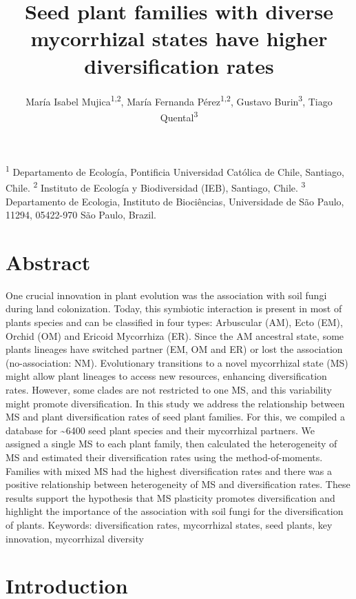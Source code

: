 \documentclass[12pt,]{article}
\title{Seed plant families with diverse mycorrhizal states have higher
diversification rates}
\author{María Isabel Mujica\textsuperscript{1,2}, María Fernanda
Pérez\textsuperscript{1,2}, Gustavo Burin\textsuperscript{3}, Tiago
Quental\textsuperscript{3}}
\date{}
\begin{document}
\maketitle

\textsuperscript{1} Departamento de Ecología, Pontificia Universidad
Católica de Chile, Santiago, Chile. \textsuperscript{2} Instituto de
Ecología y Biodiversidad (IEB), Santiago, Chile. \textsuperscript{3}
Departamento de Ecologia, Instituto de Biociências, Universidade de São
Paulo, 11294, 05422-970 São Paulo, Brazil.

\hypertarget{abstract}{%
\section{Abstract}\label{abstract}}

One crucial innovation in plant evolution was the association with soil
fungi during land colonization. Today, this symbiotic interaction is
present in most of plants species and can be classified in four types:
Arbuscular (AM), Ecto (EM), Orchid (OM) and Ericoid Mycorrhiza (ER).
Since the AM ancestral state, some plants lineages have switched partner
(EM, OM and ER) or lost the association (no-association: NM).
Evolutionary transitions to a novel mycorrhizal state (MS) might allow
plant lineages to access new resources, enhancing diversification rates.
However, some clades are not restricted to one MS, and this variability
might promote diversification. In this study we address the relationship
between MS and plant diversification rates of seed plant families. For
this, we compiled a database for \textasciitilde6400 seed plant species
and their mycorrhizal partners. We assigned a single MS to each plant
family, then calculated the heterogeneity of MS and estimated their
diversification rates using the method-of-moments. Families with mixed
MS had the highest diversification rates and there was a positive
relationship between heterogeneity of MS and diversification rates.
These results support the hypothesis that MS plasticity promotes
diversification and highlight the importance of the association with
soil fungi for the diversification of plants. Keywords: diversification
rates, mycorrhizal states, seed plants, key innovation, mycorrhizal
diversity

\hypertarget{introduction}{%
\section{Introduction}\label{introduction}}
\end{document}
